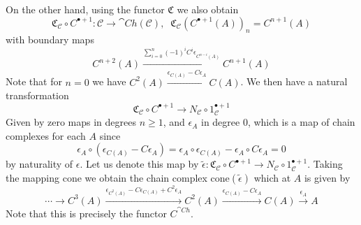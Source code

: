 On the other hand, using the functor $\mathfrak{C}$ we also obtain
\begin{equation*}
    \mathfrak{C}_\mathcal{C}\circ C^{\bullet+1}:\mathcal{C}\to\cat{Ch}(\mathcal{C}),\;\; \mathfrak{C}_\mathcal{C}(C^{\bullet+1}(A))_n = C^{n+1}(A)
\end{equation*}
with boundary maps
\begin{equation*}
    C^{n+2}(A)\xrightarrow{\sum_{i=0}^n(-1)^iC^i\epsilon_{C^{n-i}(A)}} C^{n+1}(A)
\end{equation*}
Note that for $n = 0$ we have $C^2(A)\xrightarrow{\epsilon_{C(A)}-C\epsilon_A}C(A)$. We then have a natural transformation 
\begin{equation*}
    \mathfrak{C}_\mathcal{C}\circ C^{\bullet+1}\to N_\mathcal{C}\circ 1_\mathcal{C}^{\bullet+1}
\end{equation*}
Given by zero maps in degrees $n \geq 1$, and $\epsilon_A$ in degree $0$, which is a map of chain complexes for each $A$ since 
\begin{equation*}
    \epsilon_A\circ (\epsilon_{C(A)}-C\epsilon_A) = \epsilon_A\circ \epsilon_{C(A)}-\epsilon_A\circ C\epsilon_A = 0
\end{equation*}
by naturality of $\epsilon$. Let us denote this map by $\widetilde{\epsilon}:\mathfrak{C}_\mathcal{C}\circ C^{\bullet+1}\to N_\mathcal{C}\circ 1_{\mathcal{C}}^{\bullet+1}$. Taking the mapping cone we obtain the chain complex $\text{cone}(\widetilde{\epsilon})$ which at $A$ is given by 
\begin{equation*}
    \cdots \to C^3(A)\xrightarrow{\epsilon_{C^2(A)}-C\epsilon_{C(A)}+C^2\epsilon_A}C^2(A)\xrightarrow{\epsilon_{C(A)}-C\epsilon_A}C(A)\xrightarrow{\epsilon_A}A
\end{equation*}
Note that this is precisely the functor $C^{\cat{Ch}}$. 


